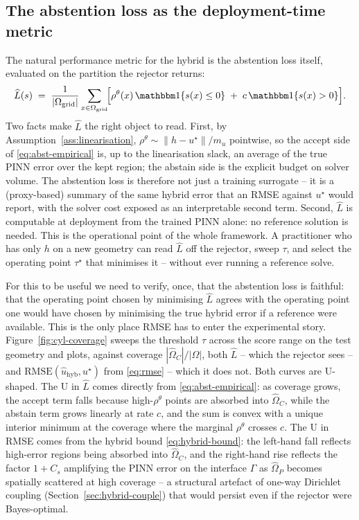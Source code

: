\subsection{The abstention loss as the deployment-time metric}
\label{sec:exp-cylinder}

The natural performance metric for the hybrid is the abstention loss
itself, evaluated on the partition the rejector returns:
\begin{equation}
  \widehat{L}(s)
  \;=\;
  \frac{1}{|\Omega_{\mathrm{grid}}|}
  \sum_{x\in\Omega_{\mathrm{grid}}}\!
  \Bigl[
    \rho^\theta(x)\,\ind\{s(x)\leq 0\}
    \;+\;c\,\ind\{s(x)>0\}
  \Bigr].
  \label{eq:abst-empirical}
\end{equation}
Two facts make $\widehat{L}$ the right object to read. First, by
Assumption~\ref{ass:linearisation},
$\rho^\theta\sim\|h-u^\star\|/m_u$ pointwise, so the accept side of
\eqref{eq:abst-empirical} is, up to the linearisation slack, an
average of the true PINN error over the kept region; the abstain
side is the explicit budget on solver volume. The abstention loss is
therefore not just a training surrogate -- it is a (proxy-based)
summary of the same hybrid error that an RMSE against $u^\star$
would report, with the solver cost exposed as an interpretable
second term. Second, $\widehat{L}$ is computable at deployment from
the trained PINN alone: no reference solution is needed. This is the
operational point of the whole framework. A practitioner who has
only $h$ on a new geometry can read $\widehat{L}$ off the rejector,
sweep $\tau$, and select the operating point $\tau^\star$ that
minimises it -- without ever running a reference solve.

For this to be useful we need to verify, once, that the abstention
loss is faithful: that the operating point chosen by minimising
$\widehat{L}$ agrees with the operating point one would have chosen
by minimising the true hybrid error if a reference were available.
This is the only place RMSE has to enter the experimental story.
Figure~\ref{fig:cyl-coverage} sweeps the threshold $\tau$ across the
score range on the test geometry and plots, against coverage
$|\widehat{\Omega}_C|/|\Omega|$, both $\widehat{L}$ -- which the
rejector sees -- and $\mathrm{RMSE}(\widehat{u}_{\mathrm{hyb}},
u^\star)$ from \eqref{eq:rmse} -- which it does not. Both curves
are U-shaped. The U in $\widehat{L}$ comes directly from
\eqref{eq:abst-empirical}: as coverage grows, the accept term falls
because high-$\rho^\theta$ points are absorbed into
$\widehat{\Omega}_C$, while the abstain term grows linearly at rate
$c$, and the sum is convex with a unique interior minimum at the
coverage where the marginal $\rho^\theta$ crosses $c$. The U in
RMSE comes from the hybrid bound \eqref{eq:hybrid-bound}: the
left-hand fall reflects high-error regions being absorbed into
$\widehat{\Omega}_C$, and the right-hand rise reflects the factor
$1+C_s$ amplifying the PINN error on the interface $\Gamma$ as
$\widehat{\Omega}_P$ becomes spatially scattered at high coverage --
a structural artefact of one-way Dirichlet coupling
(Section~\ref{sec:hybrid-couple}) that would persist even if the
rejector were Bayes-optimal.

